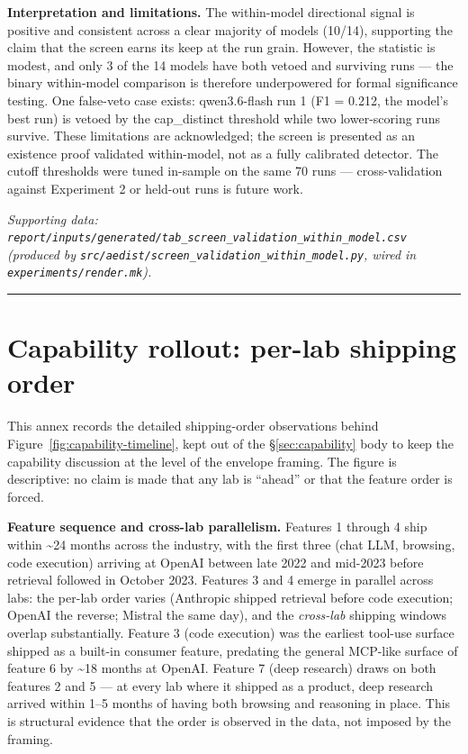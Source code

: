 \documentclass[a4paper,11pt]{article}
\begin{document}
\textbf{Interpretation and limitations.} The within-model directional
signal is positive and consistent across a clear majority of models
(10/14), supporting the claim that the screen earns its keep at the run
grain. However, the statistic is modest, and only 3 of the 14 models
have both vetoed and surviving runs --- the binary within-model
comparison is therefore underpowered for formal significance testing.
One false-veto case exists: qwen3.6-flash run 1 (F1 = 0.212, the model's
best run) is vetoed by the cap\_distinct threshold while two
lower-scoring runs survive. These limitations are acknowledged; the
screen is presented as an existence proof validated within-model, not as
a fully calibrated detector. The cutoff thresholds were tuned in-sample
on the same 70 runs --- cross-validation against Experiment 2 or
held-out runs is future work.

\emph{Supporting data:
\texttt{report/inputs/generated/tab\_screen\_validation\_within\_model.csv}
(produced by \texttt{src/aedist/screen\_validation\_within\_model.py},
wired in \texttt{experiments/render.mk}).}

\begin{center}\rule{0.5\linewidth}{0.5pt}\end{center}

\section{Capability rollout: per-lab shipping
order}\label{sec:annex-rollout}

This annex records the detailed shipping-order observations behind
Figure~\ref{fig:capability-timeline}, kept out of the
§\ref{sec:capability} body to keep the capability discussion at the
level of the envelope framing. The figure is descriptive: no claim is
made that any lab is ``ahead'' or that the feature order is forced.

\textbf{Feature sequence and cross-lab parallelism.} Features 1 through
4 ship within \textasciitilde24 months across the industry, with the
first three (chat LLM, browsing, code execution) arriving at OpenAI
between late 2022 and mid-2023 before retrieval followed in October
2023. Features 3 and 4 emerge in parallel across labs: the per-lab order
varies (Anthropic shipped retrieval before code execution; OpenAI the
reverse; Mistral the same day), and the \emph{cross-lab} shipping
windows overlap substantially. Feature 3 (code execution) was the
earliest tool-use surface shipped as a built-in consumer feature,
predating the general MCP-like surface of feature 6 by \textasciitilde18
months at OpenAI. Feature 7 (deep research) draws on both features 2 and
5 --- at every lab where it shipped as a product, deep research arrived
within 1--5 months of having both browsing and reasoning in place. This
is structural evidence that the order is observed in the data, not
imposed by the framing.
\end{document}
